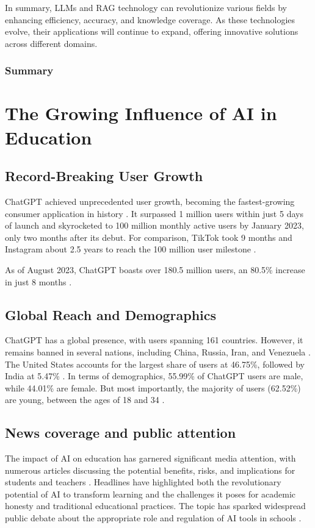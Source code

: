 \documentclass{article}
\begin{document}
In summary, LLMs and RAG technology can revolutionize various fields by enhancing efficiency, accuracy, and knowledge coverage. As these technologies evolve, their applications will continue to expand, offering innovative solutions across different domains.



\subsubsection{Summary}%


\newpage
\section{The Growing Influence of AI in Education}
\subsection{Record-Breaking User Growth}
ChatGPT achieved unprecedented user growth, becoming
the fastest-growing consumer application in history \cite{arstechnica_chatgpt_growth}.
It surpassed 1 million users within just 5 days of launch and skyrocketed to 100
million monthly active users by January 2023, only two months after its debut.
For comparison, TikTok took 9 months and Instagram about 2.5 years to reach the 100 million user milestone
\cite{arstechnica_chatgpt_growth}.

As of August 2023, ChatGPT boasts over 180.5 million users, an 80.5\% increase in just 8 months
\cite{meetanshi2023chatgpt} \cite{nerdynav_chatgpt_stats} \cite{namepepper_chatgpt_users}.


\subsection{Global Reach and Demographics}
ChatGPT has a global presence, with users spanning 161
countries. However, it remains banned in several nations,
including China, Russia, Iran, and Venezuela
\cite{investingchannel_chatgpt_bans}.
The United States accounts for the largest share of users
at 46.75\%, followed by India at 5.47\%
\cite{nerdynav_chatgpt_stats}.
In terms of demographics, 55.99\% of ChatGPT users
are male, while 44.01\% are female. But most importantly,
the majority of users (62.52\%) are young,
between the ages of 18 and 34 \cite{nerdynav_chatgpt_stats}.

\subsection{News coverage and public attention}
The impact of AI on education has garnered significant media attention,
with numerous articles discussing the potential benefits, risks,
and implications for students and teachers
\cite{bbc2023ai_education} \cite{tampabay2024ai_education} \cite{theweek2024ai_schools}.
Headlines have highlighted both the revolutionary potential of AI
to transform learning and the challenges it poses for academic
honesty and traditional educational practices. The topic has
sparked widespread public debate about the appropriate role and
regulation of AI tools in schools
\cite{tampabay2024ai_education}
\cite{theweek2024ai_schools}.
\end{document}
